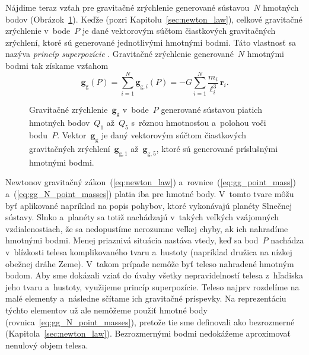 \documentclass[a4paper, 12pt]{book}
\newcommand{\gidx}{\mathrm g}
\let\vec\mathbf
\begin{document}
Nájdime teraz vzťah pre gravitačné zrýchlenie generované sústavou~$N$ hmotných 
bodov (Obrázok~\ref{fig:gg_n_point_masses}).  Keďže  (pozri 
Kapitolu~\ref{sec:newton_law}), celkové gravitačné zrýchlenie v~bode~$P$ je 
dané vektorovým súčtom čiastkových gravitačných zrýchlení, ktoré sú generované 
jednotlivými hmotnými bodmi.  Táto vlastnosť sa nazýva \emph{princíp 
superpozície} \parencite[pozri napríklad][]{Hotine}.  Gravitačné zrýchlenie 
generované~$N$ hmotnými bodmi tak získame vzťahom
%
\begin{equation}
\label{eq:gg_N_point_masses}
\vec g_\gidx(P) = \sum_{i = 1}^{N}\vec g_{\gidx,i}(P) = -G \sum_{i = 1}^{N}
\frac{m_i}{\ell_i^3} \, \vec{r}_i{.}
\end{equation}

\begin{figure}
\centering

\caption{Gravitačné zrýchlenie~$\vec g_\gidx$ v~bode~$P$ generované sústavou 
piatich hmotných bodov~$Q_1$ až~$Q_5$ s~rôznou hmotnosťou a~polohou voči 
bodu~$P$.  Vektor~$\vec g_\gidx$ je daný vektorovým súčtom čiastkových 
gravitačných zrýchlení~$\vec g_{\gidx,1}$ až~$\vec g_{\gidx,5}$, ktoré sú 
generované príslušnými hmotnými bodmi.}
\label{fig:gg_n_point_masses}
\end{figure}

Newtonov gravitačný zákon~(\ref{eq:newton_law}) 
a~rovnice~(\ref{eq:gg_point_mass}) a~(\ref{eq:gg_N_point_masses}) platia iba 
pre hmotné body.  V~tomto tvare môžu byť aplikované napríklad na popis pohybov, 
ktoré vykonávajú planéty Slnečnej sústavy.  Slnko a~planéty sa totiž nachádzajú 
v~takých veľkých vzájomných vzdialenostiach, že sa nedopustíme nerozumne veľkej 
chyby, ak ich nahradíme hmotnými bodmi.  Menej priaznivá situácia nastáva 
vtedy, keď sa bod~$P$ nachádza v~blízkosti telesa komplikovaného tvaru 
a~hustoty (napríklad družica na nízkej obežnej dráhe Zeme).  V~takom prípade 
nemôže byť teleso nahradené hmotným bodom.  Aby sme dokázali vziať do úvahy 
všetky nepravidelností telesa z~hľadiska jeho tvaru a~hustoty, využijeme 
princíp superpozície.  Teleso najprv rozdelíme na malé elementy a~následne 
sčítame ich gravitačné príspevky.  Na reprezentáciu týchto elementov už ale 
nemôžeme použiť hmotné body (rovnica~\ref{eq:gg_N_point_masses}), pretože tie 
sme definovali ako bezrozmerné (Kapitola~\ref{sec:newton_law}).  Bezrozmernými 
bodmi nedokážeme aproximovať nenulový objem telesa.
\end{document}
